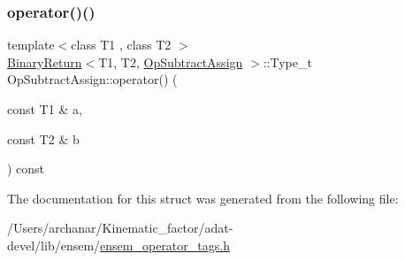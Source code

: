\subsubsection{\texorpdfstring{operator()()}{operator()()}\hspace{0.1cm}{\footnotesize\ttfamily [3/3]}}
{\footnotesize\ttfamily template$<$class T1 , class T2 $>$ \\
\mbox{\hyperlink{structBinaryReturn}{Binary\+Return}}$<$T1, T2, \mbox{\hyperlink{structOpSubtractAssign}{Op\+Subtract\+Assign}} $>$\+::Type\+\_\+t Op\+Subtract\+Assign\+::operator() (\begin{DoxyParamCaption}\item[{const T1 \&}]{a,  }\item[{const T2 \&}]{b }\end{DoxyParamCaption}) const\hspace{0.3cm}{\ttfamily [inline]}}



The documentation for this struct was generated from the following file\+:\begin{DoxyCompactItemize}
\item 
/\+Users/archanar/\+Kinematic\+\_\+factor/adat-\/devel/lib/ensem/\mbox{\hyperlink{adat-devel_2lib_2ensem_2ensem__operator__tags_8h}{ensem\+\_\+operator\+\_\+tags.\+h}}\end{DoxyCompactItemize}
